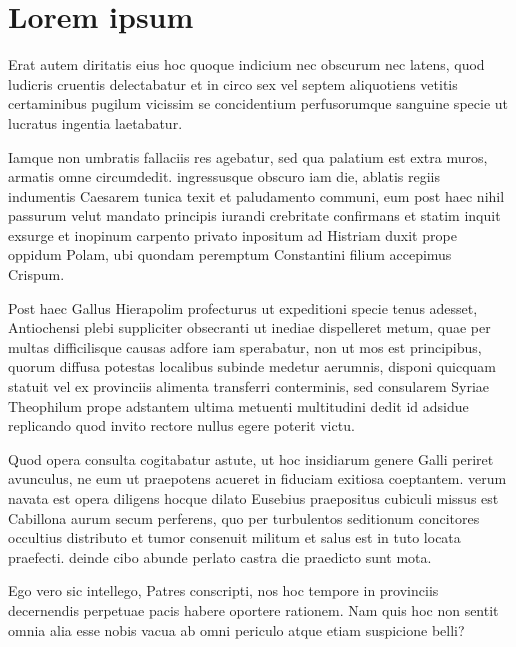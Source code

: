 ﻿\documentclass{SchoolReport}
\begin{document}

\appendix
\chapter{Lorem ipsum}
Erat autem diritatis eius hoc quoque indicium nec obscurum nec latens, quod ludicris cruentis delectabatur et in circo sex vel septem aliquotiens vetitis certaminibus pugilum vicissim se concidentium perfusorumque sanguine specie ut lucratus ingentia laetabatur.

Iamque non umbratis fallaciis res agebatur, sed qua palatium est extra muros, armatis omne circumdedit. ingressusque obscuro iam die, ablatis regiis indumentis Caesarem tunica texit et paludamento communi, eum post haec nihil passurum velut mandato principis iurandi crebritate confirmans et statim inquit exsurge et inopinum carpento privato inpositum ad Histriam duxit prope oppidum Polam, ubi quondam peremptum Constantini filium accepimus Crispum.

Post haec Gallus Hierapolim profecturus ut expeditioni specie tenus adesset, Antiochensi plebi suppliciter obsecranti ut inediae dispelleret metum, quae per multas difficilisque causas adfore iam sperabatur, non ut mos est principibus, quorum diffusa potestas localibus subinde medetur aerumnis, disponi quicquam statuit vel ex provinciis alimenta transferri conterminis, sed consularem Syriae Theophilum prope adstantem ultima metuenti multitudini dedit id adsidue replicando quod invito rectore nullus egere poterit victu.

Quod opera consulta cogitabatur astute, ut hoc insidiarum genere Galli periret avunculus, ne eum ut praepotens acueret in fiduciam exitiosa coeptantem. verum navata est opera diligens hocque dilato Eusebius praepositus cubiculi missus est Cabillona aurum secum perferens, quo per turbulentos seditionum concitores occultius distributo et tumor consenuit militum et salus est in tuto locata praefecti. deinde cibo abunde perlato castra die praedicto sunt mota.

Ego vero sic intellego, Patres conscripti, nos hoc tempore in provinciis \citetext{{ECMA}, \citeyear{ECMA-262-v6}} decernendis perpetuae pacis habere oportere rationem. Nam quis hoc non sentit omnia alia esse nobis vacua ab omni periculo atque etiam suspicione belli?


\end{document}
